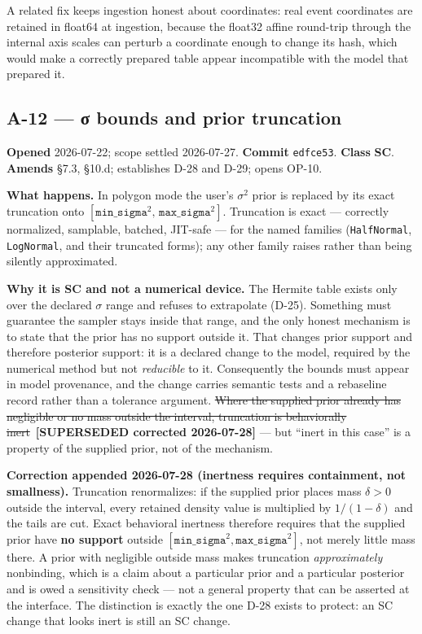 \documentclass[
  10pt,
]{article}
\newcommand{\amdstrike}[1]{\sout{#1}}
\newcommand{\amdstrike}[1]{\textcolor{supcolor}{#1}}
\newcommand{\supsd}[2]{{\color{supcolor}\amdstrike{#2}}~{\color{amdcolor}\footnotesize\textbf{[SUPERSEDED #1]}}}
\begin{document}
A related fix keeps ingestion honest about coordinates: real event coordinates are retained in float64 at ingestion, because the float32 affine round-trip through the internal axis scales can perturb a coordinate enough to change its hash, which would make a correctly prepared table appear incompatible with the model that prepared it.

\hypertarget{a-12}{%
\subsection{A-12 --- σ bounds and prior truncation}\label{a-12}}

\textbf{Opened} 2026-07-22; scope settled 2026-07-27. \textbf{Commit} \texttt{edfce53}. \textbf{Class} \textbf{SC}. \textbf{Amends} §7.3, §10.d; establishes D-28 and D-29; opens OP-10.

\textbf{What happens.} In polygon mode the user's \(\sigma^2\) prior is replaced by its exact truncation onto \(\left[\texttt{min\_sigma}^2,\, \texttt{max\_sigma}^2\right]\). Truncation is exact --- correctly normalized, samplable, batched, JIT-safe --- for the named families (\texttt{HalfNormal}, \texttt{LogNormal}, and their truncated forms); any other family raises rather than being silently approximated.

\textbf{Why it is SC and not a numerical device.} The Hermite table exists only over the declared \(\sigma\) range and refuses to extrapolate (D-25). Something must guarantee the sampler stays inside that range, and the only honest mechanism is to state that the prior has no support outside it. That changes prior support and therefore posterior support: it is a declared change to the model, required by the numerical method but not \emph{reducible} to it. Consequently the bounds must appear in model provenance, and the change carries semantic tests and a rebaseline record rather than a tolerance argument. \supsd{corrected 2026-07-28}{Where the supplied prior already has negligible or no mass outside the interval, truncation is behaviorally inert} --- but ``inert in this case'' is a property of the supplied prior, not of the mechanism.

\textbf{Correction appended 2026-07-28 (inertness requires containment, not smallness).} Truncation renormalizes: if the supplied prior places mass \(\delta > 0\) outside the interval, every retained density value is multiplied by \(1/(1-\delta)\) and the tails are cut. Exact behavioral inertness therefore requires that the supplied prior have \textbf{no support} outside \(\left[\texttt{min\_sigma}^2, \texttt{max\_sigma}^2\right]\), not merely little mass there. A prior with negligible outside mass makes truncation \emph{approximately} nonbinding, which is a claim about a particular prior and a particular posterior and is owed a sensitivity check --- not a general property that can be asserted at the interface. The distinction is exactly the one D-28 exists to protect: an SC change that looks inert is still an SC change.
\end{document}
